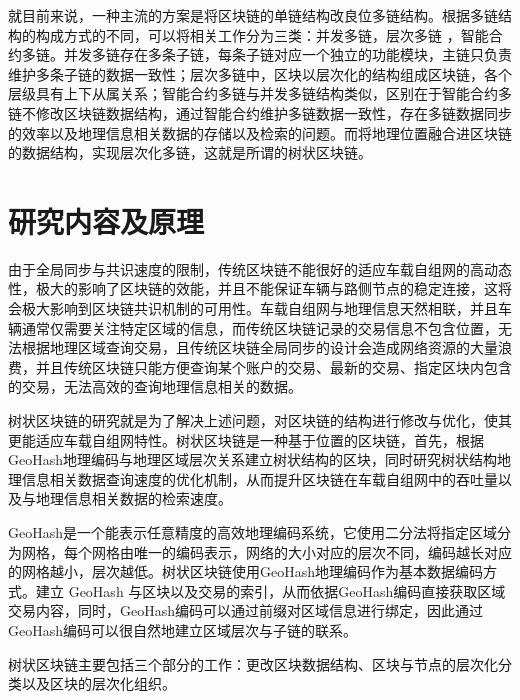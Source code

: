 就目前来说，一种主流的方案是将区块链的单链结构改良位多链结构\cite{global2020}。根据多链结构的构成方式的不同，可以将相关工作分为三类：并发多链\cite{parkmonoxide,zamani2018rapidchain,feng2019pruneable}，层次多链 \cite{jo2018hybrid,liu2019mathsf,honar2021multi,qu2018blockchain,sharma2018blockchain,mbarek2019mbs,oktian2020hierarchical}，智能合约多链\cite{sestrem2020cost}。并发多链存在多条子链，每条子链对应一个独立的功能模块，主链只负责维护多条子链的数据一致性；层次多链中，区块以层次化的结构组成区块链，各个层级具有上下从属关系；智能合约多链与并发多链结构类似，区别在于智能合约多链不修改区块链数据结构，通过智能合约维护多链数据一致性，存在多链数据同步的效率以及地理信息相关数据的存储以及检索的问题。而将地理位置融合进区块链的数据结构，实现层次化多链，这就是所谓的树状区块链。

\section{研究内容及原理}
由于全局同步与共识速度的限制，传统区块链不能很好的适应车载自组网的高动态性，极大的影响了区块链的效能，并且不能保证车辆与路侧节点的稳定连接，这将会极大影响到区块链共识机制的可用性。车载自组网与地理信息天然相联，并且车辆通常仅需要关注特定区域的信息，而传统区块链记录的交易信息不包含位置，无法根据地理区域查询交易，且传统区块链全局同步的设计会造成网络资源的大量浪费，并且传统区块链只能方便查询某个账户的交易、最新的交易、指定区块内包含的交易，无法高效的查询地理信息相关的数据。

树状区块链的研究就是为了解决上述问题，对区块链的结构进行修改与优化，使其更能适应车载自组网特性。树状区块链是一种基于位置的区块链，首先，根据GeoHash地理编码与地理区域层次关系建立树状结构的区块，同时研究树状结构地理信息相关数据查询速度的优化机制，从而提升区块链在车载自组网中的吞吐量以及与地理信息相关数据的检索速度。

GeoHash是一个能表示任意精度的高效地理编码系统，它使用二分法将指定区域分为网格，每个网格由唯一的编码表示，网络的大小对应的层次不同，编码越长对应的网格越小，层次越低。树状区块链使用GeoHash地理编码作为基本数据编码方式。建立 GeoHash 与区块以及交易的索引，从而依据GeoHash编码直接获取区域交易内容，同时，GeoHash编码可以通过前缀对区域信息进行绑定，因此通过GeoHash编码可以很自然地建立区域层次与子链的联系。

树状区块链主要包括三个部分的工作：更改区块数据结构、区块与节点的层次化分类以及区块的层次化组织。

